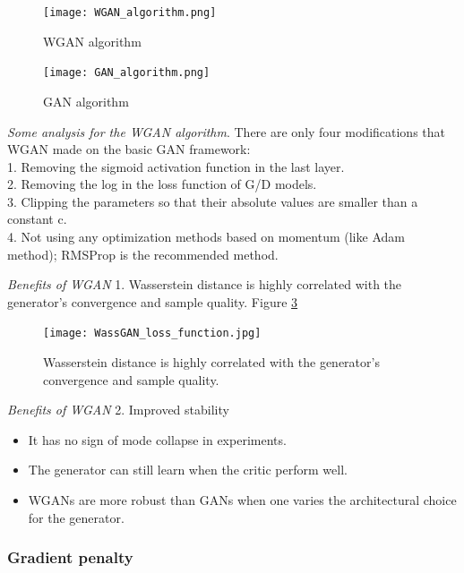 \documentclass[english]{article}
\begin{document}
 
\begin{figure}[h!]
  \caption{WGAN algorithm}
  \centering
  \texttt{[image: WGAN\_algorithm.png]}
  \label{wgan}
\end{figure}




\begin{figure}[h!]
  \caption{GAN algorithm}
  \centering
  \texttt{[image: GAN\_algorithm.png]}
    \label{gan_alg}
\end{figure}



\item {\emph{Some analysis for the WGAN algorithm}}.
There are only four modifications that WGAN made on the basic GAN framework:
~\\
1. Removing the sigmoid activation function in the last layer.\\
2. Removing the log in the loss function of G/D models.\\
3. Clipping the parameters so that their absolute values are smaller than a constant c.\\
4. Not using any optimization methods based on momentum (like Adam method); RMSProp is the recommended method.





\item {\emph{Benefits of WGAN}}
1. Wasserstein distance is highly correlated with the generator's convergence and sample quality. Figure \ref{wass_qual}
\begin{figure}[h!]
  \centering
  \texttt{[image: WassGAN\_loss\_function.jpg]}
      \caption{Wasserstein distance is highly correlated with the generator's convergence and sample quality.}
    \label{wass_qual}
\end{figure}




\item {\emph{Benefits of WGAN}}
2. Improved stability
\begin{itemize}
  \item It has no sign of mode collapse in experiments.
  \item The generator can still learn when the critic perform well.
  \item WGANs are more robust than GANs when one varies the architectural choice for the generator.
  \end{itemize}
\eenum



\subsubsection{Gradient penalty}
\end{document}
